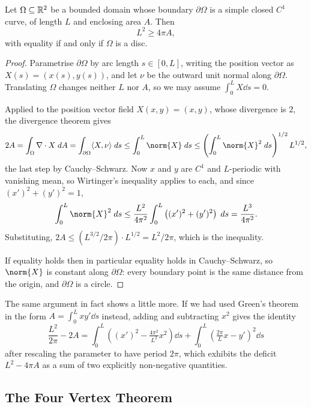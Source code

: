 \documentclass[a4paper]{scrartcl}
\begin{document}
\begin{theorem}
    Let $\Omega \subseteq \mathbb{R}^2$ be a bounded domain whose boundary $\partial\Omega$ is a simple closed $C^1$ curve, of length $L$ and enclosing area $A$. Then
    $$
    L^2 \geq 4\pi A,
    $$
    with equality if and only if $\Omega$ is a disc.
\end{theorem}
\begin{proof}
    Parametrise $\partial\Omega$ by arc length $s \in [0, L]$, writing the position vector as $X(s) = (x(s), y(s))$, and let $\nu$ be the outward unit normal along $\partial\Omega$. Translating $\Omega$ changes neither $L$ nor $A$, so we may assume $\int_0^L X \dd s = 0$.

    Applied to the position vector field $X(x,y) = (x,y)$, whose divergence is $2$, the divergence theorem gives
    $$
    2A = \int_\Omega \nabla \cdot X \dd A = \int_{\partial\Omega} \langle X, \nu\rangle \dd s \leq \int_0^L \norm{X}\dd s \leq \left(\int_0^L \norm{X}^2 \dd s\right)^{1/2}L^{1/2},
    $$
    the last step by Cauchy--Schwarz. Now $x$ and $y$ are $C^1$ and $L$-periodic with vanishing mean, so Wirtinger's inequality applies to each, and since $(x')^2 + (y')^2 = 1$,
    $$
    \int_0^L \norm{X}^2 \dd s \leq \frac{L^2}{4\pi^2}\int_0^L \left((x')^2 + (y')^2\right)\dd s = \frac{L^3}{4\pi^2}.
    $$
    Substituting, $2A \leq (L^{3/2}/2\pi)\cdot L^{1/2} = L^2/2\pi$, which is the inequality.

    If equality holds then in particular equality holds in Cauchy--Schwarz, so $\norm{X}$ is constant along $\partial\Omega$: every boundary point is the same distance from the origin, and $\partial\Omega$ is a circle.
\end{proof}

\begin{remark}
    The same argument in fact shows a little more. If we had used Green's theorem in the form $A = \int_0^L x y' \dd s$ instead, adding and subtracting $x^2$ gives the identity
    $$
    \frac{L^2}{2\pi} - 2A = \int_0^{L}\left((x')^2 - \tfrac{4\pi^2}{L^2}x^2\right)\dd s + \int_0^{L}\left(\tfrac{2\pi}{L}x - y'\right)^2\dd s
    $$
    after rescaling the parameter to have period $2\pi$, which exhibits the deficit $L^2 - 4\pi A$ as a sum of two explicitly non-negative quantities.
\end{remark}

\subsection{The Four Vertex Theorem}
\end{document}
